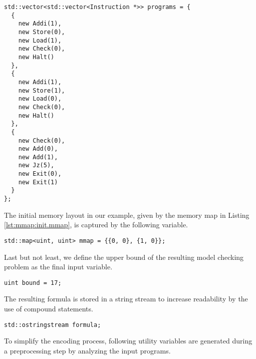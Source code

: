 \begin{lstlisting}[style=c++]
std::vector<std::vector<Instruction *>> programs = {
  {
    new Addi(1),
    new Store(0),
    new Load(1),
    new Check(0),
    new Halt()
  },
  {
    new Addi(1),
    new Store(1),
    new Load(0),
    new Check(0),
    new Halt()
  },
  {
    new Check(0),
    new Add(0),
    new Add(1),
    new Jz(5),
    new Exit(0),
    new Exit(1)
  }
};
\end{lstlisting}
The initial memory layout in our example, given by the memory map in Listing \ref{lst:mmap:init.mmap}, is captured by the following variable.
\begin{lstlisting}[style=c++]
std::map<uint, uint> mmap = {{0, 0}, {1, 0}};
\end{lstlisting}
Last but not least, we define the upper bound of the resulting model checking problem as the final input variable.
\begin{lstlisting}[style=c++]
uint bound = 17;
\end{lstlisting}
The resulting formula is stored in a string stream to increase readability by the use of compound statements.
\begin{lstlisting}[style=c++]
std::ostringstream formula;
\end{lstlisting}
To simplify the encoding process, following utility variables are generated during a preprocessing step by analyzing the input programs.

